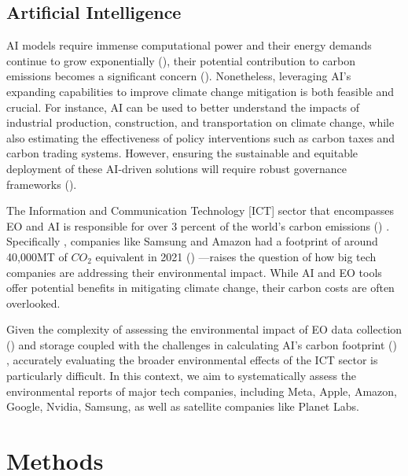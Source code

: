 \documentclass[12pt]{article}
\begin{document}
\subsection*{Artificial Intelligence}
AI models require immense computational power and their energy demands continue to grow exponentially (\cite{amodei_2018}),
 their potential contribution to carbon emissions becomes a significant concern (\cite{taddeo_2021}). Nonetheless, leveraging AI’s 
 expanding capabilities to improve climate change mitigation is both feasible and crucial. 
 For instance, AI can be used to better understand the impacts of industrial production, construction, 
 and transportation on climate change, while also estimating the effectiveness of policy interventions such 
 as carbon taxes and carbon trading systems. However, ensuring the sustainable and equitable deployment of these 
 AI-driven solutions will require robust governance frameworks (\cite{taddeo_2021}).

 The  Information and Communication Technology [ICT] sector that encompasses EO and AI
is responsible for over 3 percent of the world's carbon emissions (\cite{jones_2018}) . Specifically , 
companies like Samsung and Amazon had a footprint of around 40,000MT of \(CO_2\) equivalent in 2021 (\cite{navarro_2023_the}) —raises the question 
of how big tech companies are addressing their environmental impact. While AI and EO tools offer potential benefits in 
mitigating climate change, their carbon costs are often overlooked.

Given the complexity of assessing the environmental impact of EO data collection (\cite{wilkinson_2024}) and storage coupled with the challenges in calculating AI's carbon 
footprint (\cite{Henderson_2020}) , accurately evaluating the broader environmental effects of the ICT sector is particularly difficult. In this context, we aim to systematically 
assess the environmental reports of major tech companies, including Meta, Apple, Amazon, Google, Nvidia, Samsung, as well as satellite companies like Planet Labs. 



\section*{Methods}
\end{document}
